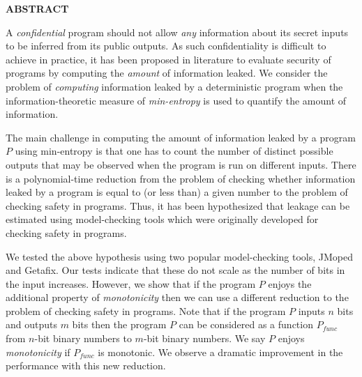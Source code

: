 \newpage
{}

\centerline{\bf \large ABSTRACT}
\vskip 10mm 

A \emph{confidential} program should not allow \emph{any} information about its secret inputs to be inferred from its public outputs.  As such confidentiality is difficult to achieve in practice, it has been proposed in literature to evaluate security of programs by computing the \emph{amount} of information leaked. %
We consider the problem of \emph{computing} 
information leaked by a deterministic  program  when the information-theoretic measure of \emph{min-entropy} is used to quantify the amount of information. 

The main challenge in computing the amount of  information leaked by a program $P$ using min-entropy is that one has to count the number of distinct possible outputs that may be observed when the program is run on different inputs. There is a polynomial-time reduction from the problem of checking whether information leaked by a program is equal to  (or less than) a given number to the problem of checking safety in  programs.  Thus, %
it has been hypothesized that leakage can be estimated using model-checking tools which were  originally developed for checking safety in programs.  
 
We tested the above  hypothesis using two popular model-checking tools, JMoped and Getafix. Our tests indicate that these   do not scale as  the number of bits
in the input increases.  However, we show that if the program $P$ enjoys the additional property of \emph{monotonicity} then we can use a different reduction to the  problem of checking safety in  programs.  Note that if the program $P$ inputs $n$ bits and outputs $m$ bits then the program $P$ can be considered as  a function $P_{func}$ from $n$-bit binary numbers to $m$-bit binary numbers.    We say $P$ enjoys   
\emph{monotonicity}  if $P_{func}$ is monotonic. %
We observe a dramatic improvement in the performance with this new reduction.


  